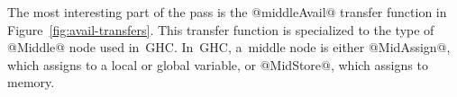 \documentclass[blockstyle,preprint,nocopyrightspace]{sigplanconf}
\newcommand{\authornote}[1]{{\em #1}}
\def\authornote#1{\unskip\relax}
\newcommand{\norman}[1]{\authornote{NR: #1}}
\let\remark\norman
\newcommand{\john}[1]{\authornote{JD: #1}}
\newcommand\figref[1]{Figure~\ref{fig:#1}}
\begin{document}



The most interesting part of the pass is the @middleAvail@ transfer
function in \figref{avail-transfers}.
\remark{Let us revise the paper to pretend that global variables
don't exist.}
This transfer function is specialized to the type of @Middle@ node
used in~GHC.
In~GHC, a~middle node is either @MidAssign@, which assigns to a local
or global variable, or @MidStore@, which assigns to memory.
\par
\ifpagetuning{\enlargethispage{\baselineskip}}\fi
\end{document}
